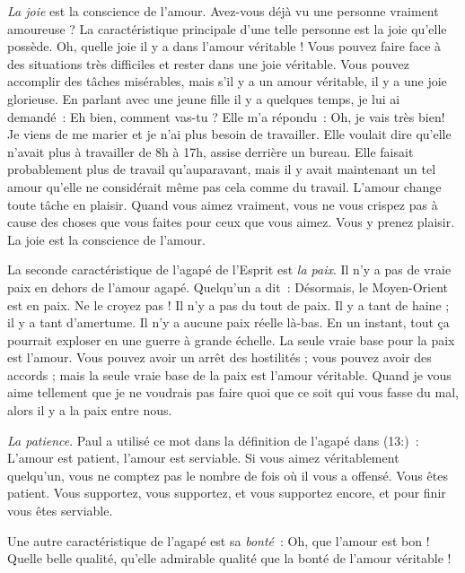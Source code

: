 \emph{La joie} est la conscience de l'amour.
 Avez-vous déjà vu une \linebreak
 personne vraiment amoureuse ?
 La caractéristique principale d'une telle personne est la joie
 qu'elle possède. Oh, quelle joie il y a dans l'amour véritable !
 Vous pouvez faire face à des situations très difficiles
 et rester dans une joie véritable. Vous pouvez accomplir
 des tâches misérables, mais s'il y a un amour véritable,
 il y a une joie glorieuse. En parlant avec une jeune fille
 il y a quelques temps, je lui ai demandé~:
 \og Eh bien, comment vas-tu ? \fg{} Elle m'a répondu~:
 \og Oh, je vais très bien! Je viens de me marier et je n'ai plus besoin
 de travailler. \fg{}
 Elle voulait dire qu'elle n'avait plus à travailler de 8h à 17h,
 assise derrière un bureau. Elle faisait probablement plus de travail
 qu'auparavant, mais il y avait maintenant un tel amour
 qu'elle ne considérait même pas cela comme du travail.
 L'amour change toute tâche en plaisir. Quand vous aimez vraiment,
 vous ne vous crispez pas à cause des choses que vous faites
 pour ceux que vous aimez. Vous y prenez plaisir.
 La joie est la conscience de l'amour.

La seconde caractéristique de l'agapé de l'Esprit est \emph{la paix}.
 Il n'y a pas de vraie paix en dehors de l'amour agapé.
 Quelqu'un a dit~: \og Désormais, le Moyen-Orient est en paix. \fg{}
 Ne le croyez pas ! Il n'y a pas du tout de paix.
 Il y a tant de haine ; il y a tant d'amertume.
 Il n'y a aucune paix réelle là-bas. En un instant, tout ça pourrait
 exploser en une guerre à grande échelle.
 La seule vraie base pour la paix est l'amour.
 Vous pouvez avoir un arrêt des hostilités ; vous pouvez avoir des accords ;
 mais la seule vraie base de la paix est l'amour véritable.
 Quand je vous aime tellement que je ne voudrais pas faire
 quoi que ce soit qui vous fasse du mal, alors il y a la paix entre nous.

\begin{specialpar}{}
\emph{La patience}. Paul a utilisé ce mot dans la définition de l'agapé
 dans (13:)~:
 \og L'amour est patient, l'amour est serviable. \fg{}
 Si vous aimez véritablement quelqu'un, vous ne comptez pas
 le nombre de fois où il vous a offensé. Vous êtes patient.
 Vous supportez, vous supportez, et vous supportez encore,
 et pour finir vous êtes serviable.
\end{specialpar}

Une autre caractéristique de l'agapé est sa \emph{bonté}~:
 Oh, que l'amour est bon ! Quelle belle qualité,
 qu'elle admirable qualité que la bonté de l'amour véritable !

